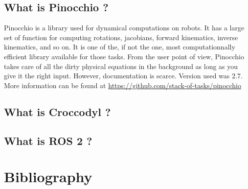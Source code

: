 \documentclass[a4paper,10pt]{article}
\begin{document}
\subsection{What is Pinocchio ?}
Pinocchio is a library used for dynamical computations on robots. It has a large set of function for computing rotations, jacobians, forward kinematics, inverse kinematics, and so on. It is one of the, if not the one, most computationnally efficient library available for those tasks. From the user point of view, Pinocchio takes care of all the dirty physical equations in the background as long as you give it the right input. However, documentation is scarce. Version used was $2.7$. More information can be found at \url{https://github.com/stack-of-tasks/pinocchio}

\subsection{What is Croccodyl ?}

\subsection{What is ROS 2 ?}





\newpage




\section{Bibliography}

\printbibliography
\end{document}
